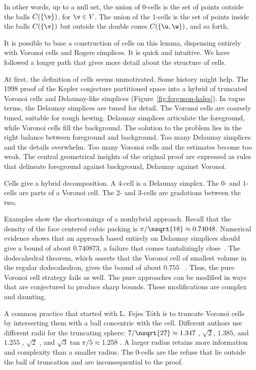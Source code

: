 \begin{cnl}
In other words, up to a null set, the union of $0$-cells is the set of points
outside the balls $C(\braced{\v})$, for $\v\in V$.  The union of the $1$-cells
is the set of points inside the balls $C(\braced{\v})$ but outside the double cones
$C(\braced{\u,\w})$, and so forth.

It is possible to base a construction of cells on this lemma,
dispensing entirely with Voronoi cells and Rogers simplices.  It is
quick and intuitive.  We have followed a longer path that gives more
detail about the structure of cells.

\bigskip

At first, the definition of  cells seems unmotivated.  Some
history might help.  The 1998 proof of the Kepler conjecture
partitioned space into a hybrid of truncated Voronoi cells and Delaunay-like
simplices (Figure~\ref{fig:ferguson-hales}).  
In vague terms, the Delaunay simplices are tuned for
detail.  The Voronoi cells are coarsely tuned, suitable for rough
hewing.  Delaunay simplices articulate the foreground, while Voronoi
cells fill the background.  The solution to the problem lies in the
right balance between foreground and background.  Too many Delaunay
simplices and the details overwhelm.  Too many Voronoi cells and the
estimates become too weak.  The central geometrical insights of the
original proof are expressed as rules that delineate foreground
against background, Delaunay against Voronoi.

\figFIFJALK %

Cells give a hybrid decomposition.  A $4$-cell is a Delaunay simplex.
The $0$- and $1$-cells are parts of a Voronoi cell.  The $2$- and
$3$-cells are gradations between the two.

Examples show the shortcomings of a nonhybrid approach.  Recall that
the density of the face centered cubic packing is
$\pi/\nsqrt{18}\approx 0.74048$.  Numerical evidence shows that an
approach based entirely on Delaunay simplices should give a bound of
about $0.740873$, a failure that comes tantalizingly
close~\cite{Hales:1992:JCAM}.  The dodecahedral theorem, which asserts
that the Voronoi cell of smallest volume in the regular dodecahedron,
gives the bound of about $0.755$ ~\cite{Hales:2010:Dodec}.  Thus, the
pure Voronoi cell strategy fails as well.  The pure approaches can be
modified in ways that are conjectured to produce sharp bounds. These
modifications are complex and daunting.

A common practice that started with L. Fejes T\'oth is to truncate
 Voronoi cells by
intersecting them with a ball concentric with the cell.  
Different authors use different radii for the
truncating sphere: $7/\nsqrt{27}\approx 1.347$ \cite{Fej53},
$\sqrt2$, $1.385$, and $1.255$ \cite{Hales:2006:DCG},  $\sqrt2$ \cite{marchal:2009},
and $\sqrt{3}\tan{\pi/5}\approx 1.258$ \cite{Hales:2010:Dodec}.  A larger radius
retains more information and complexity than a smaller radius.
The $0$-cells are the refuse that lie outside the ball of
truncation and are inconsequential to the proof.



\end{cnl}
